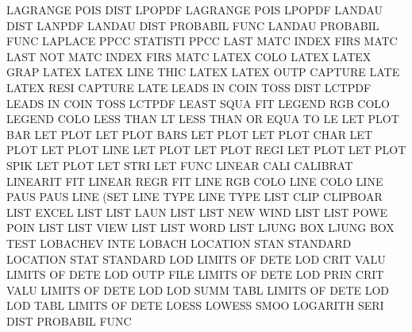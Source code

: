 LAGRANGE POIS DIST                      LPOPDF
LAGRANGE POIS                           LPOPDF
LANDAU   DIST                           LANPDF
LANDAU   DIST                           PROBABIL FUNC
LANDAU                                  PROBABIL FUNC
LAPLACE  PPCC                           STATISTI PPCC
LAST     MATC                           INDEX    FIRS MATC
LAST     NOT  MATC                      INDEX    FIRS MATC
LATEX    COLO                           LATEX
LATEX    GRAP                           LATEX
LATEX    LINE THIC                      LATEX
LATEX    OUTP                           CAPTURE  LATE
LATEX    RESI                           CAPTURE  LATE
LEADS    IN   COIN TOSS DIST            LCTPDF
LEADS    IN   COIN TOSS                 LCTPDF
LEAST    SQUA                           FIT
LEGEND   RGB  COLO                      LEGEND   COLO
LESS     THAN                           LT
LESS     THAN OR   EQUA TO              LE
LET      PLOT BAR                       LET      PLOT
LET      PLOT BARS                      LET      PLOT
LET      PLOT CHAR                      LET      PLOT
LET      PLOT LINE                      LET      PLOT
LET      PLOT REGI                      LET      PLOT
LET      PLOT SPIK                      LET      PLOT
LET      STRI                           LET      FUNC
LINEAR   CALI                           CALIBRAT
LINEARIT                                FIT
LINEAR   REGR                           FIT
LINE     RGB  COLO                      LINE     COLO
LINE     PAUS                           PAUS     LINE (SET
LINE     TYPE                           LINE     TYPE
LIST     CLIP                           CLIPBOAR
LIST     EXCEL                          LIST
LIST     LAUN                           LIST
LIST     NEW  WIND                      LIST
LIST     POWE POIN                      LIST
LIST     VIEW                           LIST
LIST     WORD                           LIST
LJUNG    BOX                            LJUNG    BOX  TEST
LOBACHEV INTE                           LOBACH
LOCATION STAN                           STANDARD
LOCATION STAT                           STANDARD
LOD                                     LIMITS   OF   DETE
LOD      CRIT VALU                      LIMITS   OF   DETE
LOD      OUTP FILE                      LIMITS   OF   DETE
LOD      PRIN CRIT VALU                 LIMITS   OF   DETE
LOD      LOD  SUMM TABL                 LIMITS   OF   DETE
LOD      LOD  TABL                      LIMITS   OF   DETE
LOESS                                   LOWESS   SMOO
LOGARITH SERI DIST                      PROBABIL FUNC

